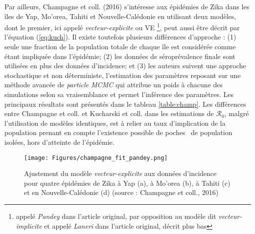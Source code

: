 Par ailleurs, Champagne et coll. (2016) \cite{Champagne064949} s'intéresse aux épidémies de Zika dans les îles de Yap, Mo'orea, Tahiti et Nouvelle-Calédonie en utilisant deux modèles, dont le premier, ici appelé {\em vecteur-explicite} ou VE \footnote{appelé {\em Pandey} dans l'article original, par opposition au modèle dit {\em vecteur-implicite} et appelé {\em Laneri} dans l'article original, décrit plus bas}, peut aussi être décrit par l'équation (\ref{eq:kuch}).
Il existe toutefois plusieurs différences d'approche : (1) seule une fraction de la population totale de chaque île est considérée comme étant impliquée dans l'épidémie; (2) les données de séroprévalence finale sont utilisées en plus des données d'incidence; et (3) les auteurs suivent une approche stochastique et non déterministe, l'estimation des paramètres reposant sur une méthode avancée de {\em particle MCMC} qui attribue un poids à chacune des simulations selon sa vraisemblance et permet l'inférence des paramètres.
Les principaux résultats sont présentés dans le tableau \ref{table:champ}.
Les différences entre Champagne et coll. et Kucharski et coll. dans les estimations de $\mathcal{R}_0$, malgré l'utilisation de modèles identiques, est à relier au taux d'implication de la population prenant en compte l'existence possible de \guillemotleft poches \guillemotright\ de population isolées, hors d'atteinte de l'épidémie.

\begin{figure}[t]
	\centering
	\texttt{[image: Figures/champagne\_fit\_pandey.png]}
	\caption{Ajustement du modèle {\em vecteur-explicite} aux données d'incidence pour quatre épidémies de Zika à Yap (a), à Mo'orea (b), à Tahiti (c) et en Nouvelle-Calédonie (d) (source : Champagne et coll., 2016)}
	\label{fig:kuch_fit}
\end{figure}

